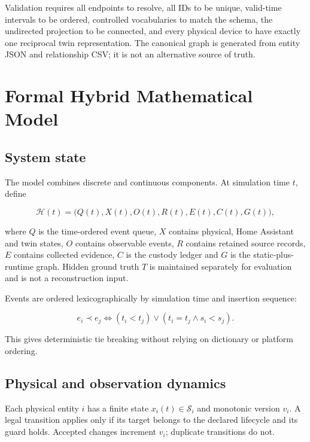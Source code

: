﻿\documentclass[11pt,a4paper]{article}
\begin{document}
Validation requires all endpoints to resolve, all IDs to be unique, valid-time intervals to be ordered, controlled vocabularies to match the schema, the undirected projection to be connected, and every physical device to have exactly one reciprocal twin representation. The canonical graph is generated from entity JSON and relationship CSV; it is not an alternative source of truth.

\section{Formal Hybrid Mathematical Model}

\subsection{System state}

The model combines discrete and continuous components. At simulation time $t$, define

\begin{equation}
\mathcal{H}(t)=\bigl(Q(t),X(t),O(t),R(t),E(t),C(t),G(t)\bigr),
\end{equation}

where $Q$ is the time-ordered event queue, $X$ contains physical, Home Assistant and twin states, $O$ contains observable events, $R$ contains retained source records, $E$ contains collected evidence, $C$ is the custody ledger and $G$ is the static-plus-runtime graph. Hidden ground truth $T$ is maintained separately for evaluation and is not a reconstruction input.

Events are ordered lexicographically by simulation time and insertion sequence:

\begin{equation}
e_i \prec e_j \iff (t_i<t_j)\lor(t_i=t_j\land s_i<s_j).
\end{equation}

This gives deterministic tie breaking without relying on dictionary or platform ordering.

\subsection{Physical and observation dynamics}

Each physical entity $i$ has a finite state $x_i(t)\in\mathcal{S}_i$ and monotonic version $v_i$. A legal transition applies only if its target belongs to the declared lifecycle and its guard holds. Accepted changes increment $v_i$; duplicate transitions do not.
\end{document}
